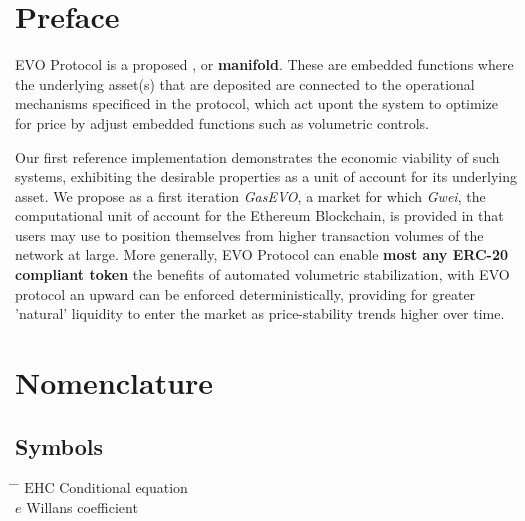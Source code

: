 
\chapter*{Preface}

EVO Protocol is a proposed , or \textbf{manifold}.
These are embedded functions where the underlying asset(s) that are deposited are connected to the operational mechanisms specificed in the protocol, which act upont the system to optimize for price by adjust embedded functions such as volumetric controls.\\
\vspace{2mm}
    
Our first reference implementation demonstrates the economic viability of such systems, exhibiting the desirable properties as a unit of account for its underlying asset.
We propose as a first iteration \textit{GasEVO}, a market for  which\textit{ Gwei}, the computational unit of account for the Ethereum Blockchain, is provided in that users may use to position themselves from higher transaction volumes of the network at large.
\vspace{2mm}
More generally, EVO Protocol can enable \textbf{most any ERC-20 compliant token} the benefits of automated volumetric stabilization, with EVO protocol an upward  can be enforced deterministically, providing for greater 'natural' liquidity to enter the market as price-stability trends higher over time. 


\cleardoublepage


\setcounter{tocdepth}{2}
\tableofcontents

\cleardoublepage



\chapter*{Nomenclature}\label{chap:symbole}

\section*{Symbols}
\begin{tabbing}
	\hspace*{1.6cm} \= \hspace*{8cm} \= \kill
	$\mathrm{EHC}$ \> Conditional equation \> [$-$] \\[0.5ex]
		$e$ \> Willans coefficient \> [$-$] \\
		\end{tabbing}
		
